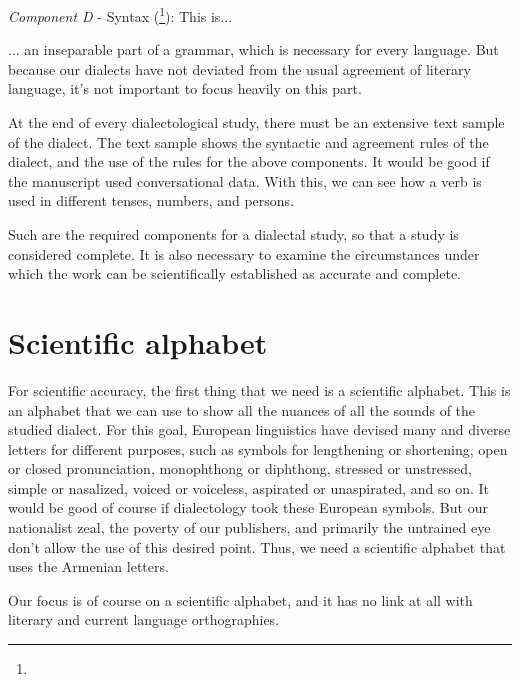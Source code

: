\textit{Component D} - Syntax (\footnote{}): This is... 

\begin{adjarianpage}\label{page:6}\end{adjarianpage}%


... an inseparable part of a grammar, which is necessary for every language. But because our dialects have not deviated from the usual agreement of literary language, it's not important to focus heavily on this part. 

At the end of every dialectological study, there must be an extensive text sample of the dialect. The text sample shows the syntactic and agreement rules of the dialect, and the use of the rules for the above components. It would be good if the manuscript used conversational data. With this, we can see how a verb is used in different tenses, numbers, and persons. 

Such are the required components for a dialectal study, so that a study is considered complete. It is also necessary to examine the circumstances under which the work can be scientifically established as accurate and complete. 

\section{Scientific alphabet}\label{sec:IntroAdjarian:scientificAlphabet}

For scientific accuracy, the first thing that we need is a scientific alphabet. This is an alphabet that we can use to show all the nuances of all the sounds of the studied dialect. For this goal, European linguistics have devised many and diverse letters for different purposes, such as symbols for lengthening or shortening, open or closed pronunciation, monophthong or diphthong, stressed or unstressed, simple or nasalized, voiced or voiceless, aspirated or unaspirated, and so on. It would be good of course if dialectology took these European symbols. But our nationalist zeal, the poverty of our publishers, and primarily the untrained eye don't allow the use of this desired point. Thus, we need a scientific alphabet that uses the Armenian letters.

Our focus is of course on a scientific alphabet, and it has no link at all with literary and current language orthographies. 

